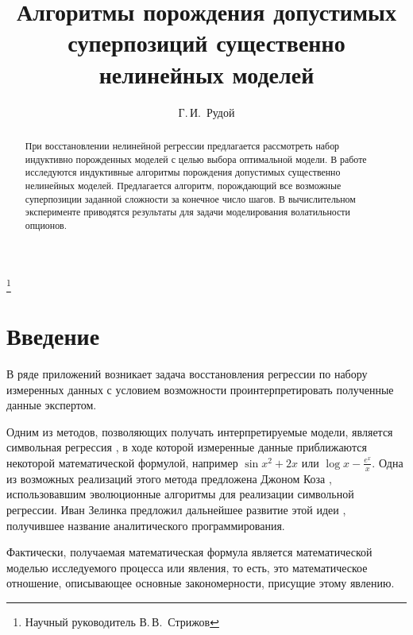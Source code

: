 \documentclass[12pt,a4paper]{amsart}
\begin{document}
\pagestyle{plain}

\title{Алгоритмы порождения допустимых суперпозиций существенно нелинейных моделей}
\author{Г.\,И.~Рудой}
\address{Московский физико-технический институт, ФУПМ, каф. <<Интеллектуальные системы>>}
\thanks{Научный руководитель В.\,В.~Стрижов}

\begin{abstract}
  При восстановлении нелинейной регрессии предлагается рассмотреть набор
  индуктивно порожденных моделей с целью выбора оптимальной модели. В работе
  исследуются индуктивные алгоритмы порождения допустимых существенно
  нелинейных моделей. Предлагается алгоритм, порождающий все возможные
  суперпозиции заданной сложности за конечное число шагов. В вычислительном
  эксперименте приводятся результаты для задачи моделирования волатильности
  опционов.
\end{abstract}

\maketitle

\section{Введение}

В ряде приложений \cite{Barmpalexis201175} \cite{Shi:2011:CRM}
\cite{DOI:10.1504/IJCENT.2010.038358} возникает задача восстановления
регрессии по набору измеренных данных с условием возможности проинтерпретировать
полученные данные экспертом.

Одним из методов, позволяющих получать интерпретируемые модели, является
символьная регрессия \cite{davidson:2000:snrea} \cite{reference/ml/X10vc},
в ходе которой измеренные данные приближаются
некоторой математической формулой, например $ \sin x^2 + 2x $ или
$\log x - \frac{e^x}{x} $. Одна из возможных реализаций этого метода
предложена Джоном Коза \cite{Koza1998GP} \cite{Koza1998Intro}, использовавшим
эволюционные алгоритмы для реализации символьной регрессии. Иван Зелинка
предложил дальнейшее развитие этой идеи \cite{Zelinka2008}, получившее
название аналитического программирования.

Фактически, получаемая математическая формула является математической моделью
\cite{Pavlovsky2000} исследуемого процесса или явления, то есть, это
математическое отношение, описывающее основные закономерности, присущие этому
явлению.
\end{document}
